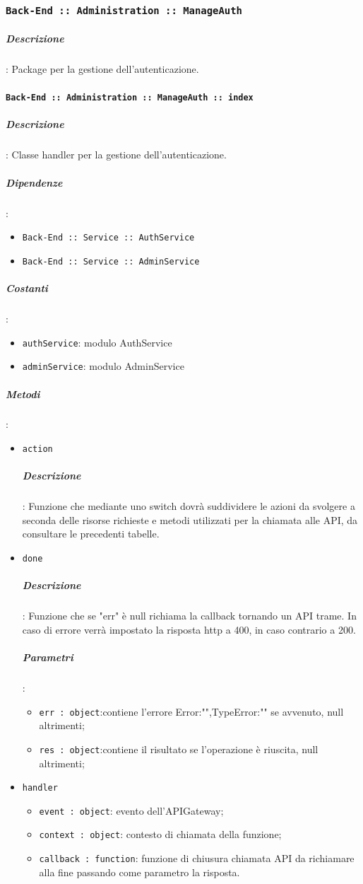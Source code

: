 \documentclass[../DefinizioneDiProdotto_v3.0.0.tex]{subfiles}
\begin{document}
\subsubsection{\texttt{Back-End :: Administration :: ManageAuth}}
\subparagraph{Descrizione}: Package per la gestione dell'autenticazione.

\paragraph{\texttt{Back-End :: Administration :: ManageAuth :: index}}
\subparagraph{Descrizione}: Classe handler per la gestione dell'autenticazione.
\subparagraph{Dipendenze}:
\begin{itemize}
	\item \texttt{Back-End :: Service :: AuthService}
	\item	\texttt{Back-End :: Service :: AdminService}
\end{itemize}
\subparagraph{Costanti}:
\begin{itemize}
	\item \texttt{authService}: modulo AuthService
	\item \texttt{adminService}: modulo AdminService
\end{itemize}
\subparagraph{Metodi}:
\begin{itemize}
	\item \texttt{action}
	      \subparagraph{Descrizione}: Funzione che mediante uno switch dovrà suddividere le azioni da svolgere a seconda delle risorse richieste e metodi utilizzati per la chiamata alle API, da consultare le precedenti tabelle.
	\item \texttt{done}
	      \subparagraph{Descrizione}: Funzione che se "err" è null richiama la callback tornando un API trame. In caso di errore verrà impostato la risposta http a 400, in caso contrario a 200.
	      \subparagraph{Parametri}:
	      \begin{itemize}
	      	\item \texttt{err : object}:contiene l'errore {Error:"",TypeError:""} se avvenuto, null altrimenti;
	      	\item \texttt{res : object}:contiene il risultato se l'operazione è riuscita, null altrimenti;
	      \end{itemize}
	\item \texttt{handler}
	      \begin{itemize}
	      	\item \texttt{event : object}: evento dell'APIGateway;
	      	\item \texttt{context : object}: contesto di chiamata della funzione;
	      	\item \texttt{callback : function}: funzione di chiusura chiamata API da richiamare alla fine passando come parametro la risposta.
	      \end{itemize}
\end{itemize}
\end{document}
